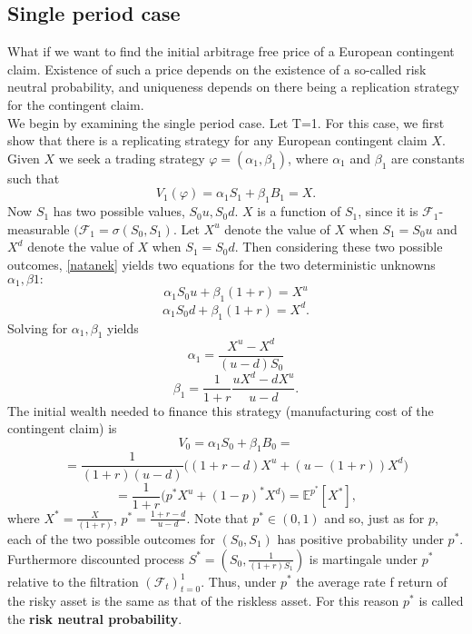 \documentclass{book}
\begin{document}
\subsection{Single period case}
What if we want to find the initial arbitrage free price of a European contingent claim. Existence of such a price depends on the existence of a so-called risk neutral probability, and uniqueness depends on there being a replication strategy for the contingent claim.\\
We begin by examining the single period case. Let T=1. For this case, we first show that there is a replicating strategy for any European contingent claim $X$. Given $X$ we seek a trading strategy $\varphi=(\alpha_{1},\beta_{1})$, where $\alpha_{1}$ and $\beta_{1}$ are constants such that
\begin{equation}
\label{natanek}
V_{1}(\varphi)=\alpha_{1}S_{1}+\beta_{1}B_{1}=X.
\end{equation}
Now $S_{1}$ has two possible values, $S_{0}u, S_{0}d$. $X$ is a function of $S_{1}$, since it is $\mathcal{F}_{1}$-measurable $(\mathcal{F}_{1}=\sigma(S_{0},S_{1})$. Let $X^{u}$ denote the value of $X$ when $S_{1}=S_{0}u$ and $X^{d}$ denote the value of $X$ when $S_{1}=S_{0}d.$ Then considering these two possible outcomes, \eqref{natanek} yields two equations for the two deterministic unknowns $\alpha_{1},\beta{1}:$
\begin{equation}
\alpha_{1}S_{0}u+\beta_{1}(1+r)=X^{u}
\end{equation} 
\begin{equation}
\alpha_{1}S_{0}d+\beta_{1}(1+r)=X^{d}.
\end{equation}
Solving for $\alpha_{1},\beta_{1}$ yields
\begin{equation}
\alpha_{1}=\frac{X^{u}-X^{d}}{(u-d)S_{0}}
\end{equation} 
\begin{equation}
\beta_{1}=\frac{1}{1+r}\frac{uX^{d}-dX^{u}}{u-d}.
\end{equation}
The initial wealth needed to finance this strategy (manufacturing cost of the contingent claim) is
$$
V_{0}=\alpha_{1}S_{0}+\beta_{1}B_{0}=
$$
$$
=\frac{1}{(1+r)(u-d)}\big((1+r-d)X^{u}+(u-(1+r))X^{d}\big)
$$
$$
=\frac{1}{1+r}\Big(p^{\ast}X^{u}+(1-p)^{\ast}X^{d}\Big)=\mathbb{E}^{p^{\ast}}[X^{\ast}],
$$
where $X^{\ast}=\frac{X}{(1+r)}$, $p^{\ast}=\frac{1+r-d}{u-d}$.
Note that $p^{\ast}\in(0,1)$ and so, just as for $p$, each of the two possible outcomes for $(S_{0},S_{1})$ has positive probability under $p^{\ast}$. Furthermore discounted process $S^{\ast}=(S_{0},\frac{1}{(1+r)S_{1}})$ is martingale under $p^{\ast}$ relative to the filtration $(\mathcal{F}_{t})_{t=0}^{1}.$ Thus, under $p^{\ast}$ the average rate f return of the risky asset is the same as that of the riskless asset. For this reason $p^{\ast}$ is called the \textbf{risk neutral probability}.\\
\end{document}
